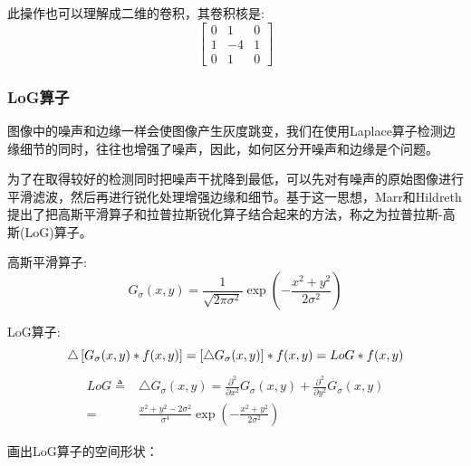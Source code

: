 此操作也可以理解成二维的卷积，其卷积核是:
\begin{equation*}
\left[ \begin{array}{lll}{0} & {1} & {0} \\ {1} & {-4} & {1} \\ {0} & {1} & {0}\end{array}\right]
\end{equation*}
\subsubsection{LoG算子}
图像中的噪声和边缘一样会使图像产生灰度跳变，我们在使用Laplace算子检测边缘细节的同时，往往也增强了噪声，因此，如何区分开噪声和边缘是个问题。\par
为了在取得较好的检测同时把噪声干扰降到最低，可以先对有噪声的原始图像进行平滑滤波，然后再进行锐化处理增强边缘和细节。基于这一思想，Marr和Hildreth\cite{marr1980theory}提出了把高斯平滑算子和拉普拉斯锐化算子结合起来的方法，称之为拉普拉斯-高斯(LoG)算子。\par
高斯平滑算子:
\begin{equation}
G_{\sigma}(x, y)=\frac{1}{\sqrt{2 \pi \sigma^{2}}} \exp \left(-\frac{x^{2}+y^{2}}{2 \sigma^{2}}\right)
\end{equation}\par
LoG算子:
\begin{equation}
\triangle\left[G_{\sigma}(x, y) * f(x, y)\right]=\left[\triangle G_{\sigma}(x, y)\right] * f(x, y)=L o G * f(x, y)
\\
\end{equation}
\begin{equation}
\begin{aligned}
L o G \triangleq& \triangle G_{\sigma}(x, y)=\frac{\partial^{2}}{\partial x^{2}} G_{\sigma}(x, y)+\frac{\partial^{2}}{\partial y^{2}} G_{\sigma}(x, y)\\
=&\frac{x^{2}+y^{2}-2 \sigma^{2}}{\sigma^{4}} \exp \left(-\frac{x^{2}+y^{2}}{2 \sigma^{2}}\right)
\end{aligned}
\end{equation}\par
画出LoG算子的空间形状：
